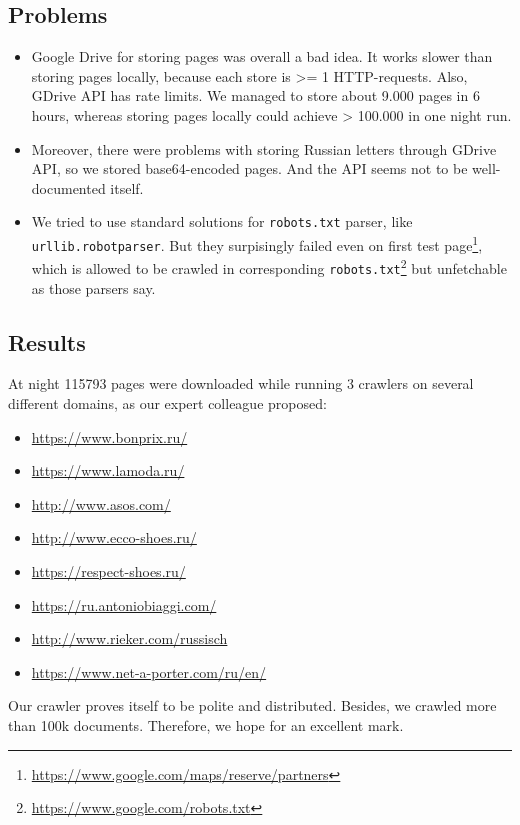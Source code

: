 \subsection{Problems}

\begin{itemize}
\item Google Drive for storing pages was overall a bad idea. It works slower than storing pages locally, because each store is >= 1 HTTP-requests. 
Also, GDrive API has rate limits. We managed to store about 9.000 pages in 6 hours, whereas storing pages locally could achieve > 100.000 in one night run.

\item Moreover, there were problems with storing Russian let\-ters through GDrive API, so we stored base64-encoded pages. And the API seems not to be well-documented itself.

\item We tried to use standard solutions for \texttt{robots.txt} pars\-er, like \texttt{urllib.robotparser}. 
But they surpisingly failed even on first test page\footnote{\url{https://www.google.com/maps/reserve/partners}}, which is allowed to be crawled in corresponding \texttt{robots.txt}\footnote{\url{https://www.google.com/robots.txt}} but un\-fetch\-able as those parsers say. 
\end{itemize}


\subsection{Results}

At night 115793 pages were downloaded while running 3 crawlers on several different domains, as our expert colleague pro\-posed:
\begin{itemize}
    \item \url{https://www.bonprix.ru/}
    \item \url{https://www.lamoda.ru/}
    \item \url{http://www.asos.com/}
    \item \url{http://www.ecco-shoes.ru/}
    \item \url{https://respect-shoes.ru/} %
    \item \url{https://ru.antoniobiaggi.com/} %
    \item \url{http://www.rieker.com/russisch}
    \item \url{https://www.net-a-porter.com/ru/en/}
\end{itemize}

Our crawler proves itself to be polite and distributed. Besides, we crawled more than 100k documents. Therefore, we hope for an excellent mark.